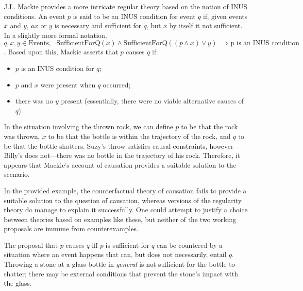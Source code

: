 \documentclass{article}
\begin{document}
J.L. Mackie provides a more intricate regular theory based on the notion of INUS conditions. An event $p$ is said to be an INUS condition for event $q$ if, given events $x$ and $y$, $ax$ or $y$ is necessary and sufficient for $q$, but $x$ by itself it not sufficient. In a slightly more formal notation, $q, x, y \in \text{Events}, \lnot\mathrm{SufficientForQ}(x) \land \mathrm{SufficientForQ}((p \land x) \lor y) \implies \text{p is an INUS condition}$. Based upon this, Mackie asserts that $p$ causes $q$ if:

    \begin{itemize}
    \item $p$ is an INUS condition for $q$;
    \item $p$ and $x$ were present when $q$ occurred;
    \item there was no $y$ present (essentially, there were no viable alternative causes of $q$).
    \end{itemize}

In the situation involving the thrown rock, we can define $p$ to be that the rock was thrown, $x$ to be that the bottle is within the trajectory of the rock, and $q$ to be that the bottle shatters. Suzy's throw satisfies causal constraints, however Billy's does not---there was no bottle in the trajectory of his rock. Therefore, it appears that Mackie's account of causation provides a suitable solution to the scenario.

\medbreak

In the provided example, the counterfactual theory of causation fails to provide a suitable solution to the question of causation, whereas versions of the regularity theory do manage to explain it successfully. One could attempt to justify a choice between theories based on examples like these, but neither of the two working proposals are immune from counterexamples.

The proposal that $p$ causes $q$ iff $p$ is sufficient for $q$ can be countered by a situation where an event happens that can, but does not necessarily, entail $q$. Throwing a stone at a glass bottle in \textit{general} is not sufficient for the bottle to shatter; there may be external conditions that prevent the stone's impact with the glass.
\end{document}
